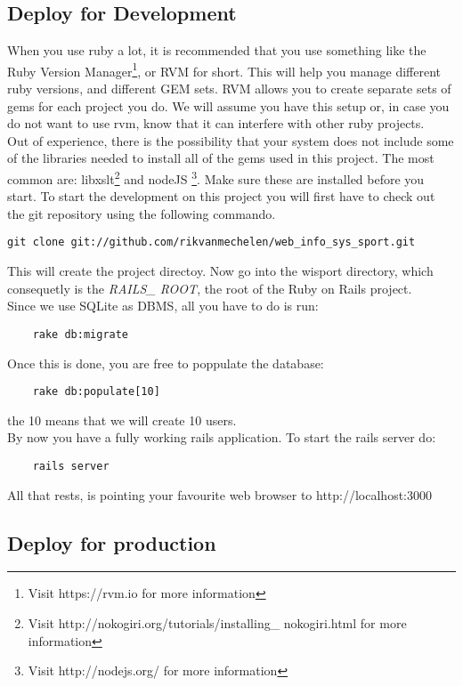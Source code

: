 \subsection{Deploy for Development}
When you use ruby a lot, it is recommended that you use something like the Ruby Version Manager\footnote{Visit https://rvm.io for more information}, or RVM for short. This will help you manage different ruby versions, and different GEM sets. RVM allows you to create separate sets of gems for each project you do. We will assume you have this setup or, in case you do not want to use rvm, know that it can interfere with other ruby projects.\\
Out of experience, there is the possibility that your system does not include some of the libraries needed to install all of the gems used in this project. The most common are: libxslt\footnote{Visit http://nokogiri.org/tutorials/installing\_ nokogiri.html for more information} and nodeJS \footnote{Visit http://nodejs.org/ for more information}. Make sure these are installed before you start.
To start the development on this project you will first have to check out the git repository using the following commando.
\begin{lstlisting}
git clone git://github.com/rikvanmechelen/web_info_sys_sport.git
\end{lstlisting}
This will create the project directoy. Now go into the wisport directory, which consequetly is the \textit{RAILS\_ ROOT}, the root of the Ruby on Rails project.\\
Since we use SQLite as DBMS, all you have to do is run:
\begin{lstlisting}
	rake db:migrate
\end{lstlisting}
Once this is done, you are free to poppulate the database: 
\begin{lstlisting}
	rake db:populate[10]
\end{lstlisting}
the 10 means that we will create 10 users.\\
By now you have a fully working rails application.
To start the rails server do:
\begin{lstlisting}
	rails server
\end{lstlisting}
All that rests, is pointing your favourite web browser to http://localhost:3000

\subsection{Deploy for production}
